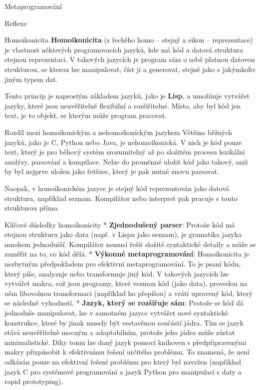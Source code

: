 \chap Metaprogramování

\sec Reflexe

\sec Homoikonicita
{\bf Homoikonicita} (z řeckého homo – stejný a eikon – reprezentace) je vlastnost některých programovacích jazyků, kde má kód a datová struktura stejnou reprezentaci. V takových jazycích je program sám o sobě platnou datovou strukturou, se kterou lze manipulovat, číst ji a generovat, stejně jako s jakýmkoliv jiným typem dat.

Tento princip je naprostým základem jazyků, jako je {\bf Lisp}, a umožňuje vytvářet jazyky, které jsou neuvěřitelně flexibilní a rozšiřitelné. Místo, aby byl kód jen text, je to objekt, se kterým může program pracovat.

\secc Rozdíl mezi homoikonickým a nehomoikonickým jazykem
Většina běžných jazyků, jako je C, Python nebo Java, je nehomoikonická. V nich je kód pouze text, který je pro běhový systém srozumitelný až po složitém procesu lexikální analýzy, parsování a kompilace. Nelze do proměnné uložit kód jako takový, aniž by byl nejprve uložen jako řetězec, který je pak nutné znovu parsovat.

Naopak, v homoikonickém jazyce je stejný kód reprezentován jako datová struktura, například seznam. Kompilátor nebo interpret pak pracuje s touto strukturou přímo.

\secc Klíčové důsledky homoikonicity
\begitems 
* {\bf Zjednodušený parser}: Protože kód má stejnou strukturu jako data (např. v Lispu jako seznam), je gramatika jazyka mnohem jednodušší. Kompilátor nemusí řešit složité syntaktické detaily a může se zaměřit na to, co kód dělá.
* {\bf Výkonné metaprogramování}: Homoikonicita je nezbytným předpokladem pro efektivní metaprogramování. To je psaní kódu, který píše, analyzuje nebo transformuje jiný kód. V takových jazycích lze vytvářet makra, což jsou programy, které vezmou kód (jako data), provedou na něm libovolnou transformaci (například ho přepíšou) a vrátí upravený kód, který se následně vyhodnotí.
* {\bf Jazyk, který se rozšiřuje sám}: Protože se kód dá jednoduše manipulovat, lze v samotném jazyce vytvářet nové syntaktické konstrukce, které by jinak musely být vestavěnou součástí jádra. Tím se jazyk stává neuvěřitelně mocným a adaptabilním, protože jeho jádro může zůstat minimalistické. Díky tomu lze daný jazyk pomocí knihoven s předpřipravenými makry přizpůsobit k efektivnímu řešení určitého problému. To znamená, že není odkázán pouze na efektivní řešení problému pro který byl navržen (například jazyk C pro systémové programování a jazyk Python pro manipulaci s daty a rapid prototyping).
\enditems


